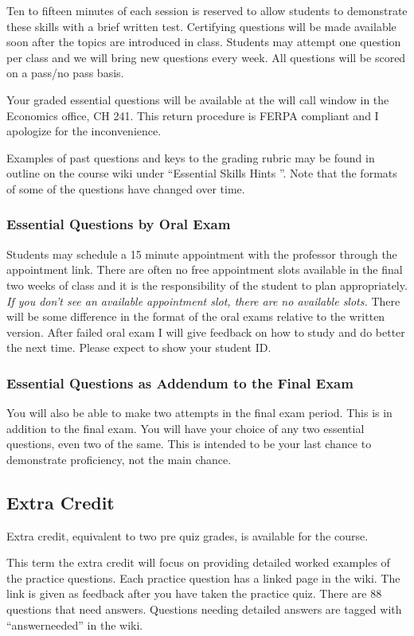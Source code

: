 \documentclass[letterpaper,10pt]{article}
\begin{document}
Ten to fifteen minutes of each session is reserved to allow students to demonstrate these skills with a brief written test. Certifying questions will be made available soon after the topics are introduced in class. Students may attempt one question per class and we will bring new questions every week.  All questions will be scored on a pass/no pass basis. 

Your graded essential questions will be available at the will call window in the Economics office, CH 241.  This return procedure is FERPA compliant and I apologize for the inconvenience.

Examples of past questions and keys to the grading rubric may be found
in outline on the course wiki under ``Essential Skills Hints ''.  Note that the formats of some of the questions have changed over time.

\subsubsection{Essential Questions by Oral Exam}

Students may schedule a 15 minute appointment with the professor through the appointment link. There are often no free appointment slots available in the final two weeks of class and it is the responsibility of the student to plan appropriately. \emph{If you don’t see an available appointment slot, there are no available slots.} There will be some difference in the format of the oral exams relative to the written version. After failed oral exam I will give feedback on how to study and do better the next time. Please expect to show your student ID.

\subsubsection{ Essential Questions as Addendum to the Final Exam}
You will also be able to make two attempts in the final exam period. This is in addition to the final exam. You will have your choice of any two essential questions, even two of the same. This is intended to be your last chance to demonstrate proficiency, not the main chance.

\subsection{Extra Credit}\label{sec:ExtraCredit}
Extra credit, equivalent to two pre quiz grades, is available for the
course.  

This term the extra credit will focus on providing detailed worked examples of the practice questions.  Each practice question has a linked page in the wiki.  The link is given as feedback after you have taken the practice quiz.  There are 88 questions that need answers.  Questions needing detailed answers are tagged with ``answerneeded'' in the wiki.
\end{document}
